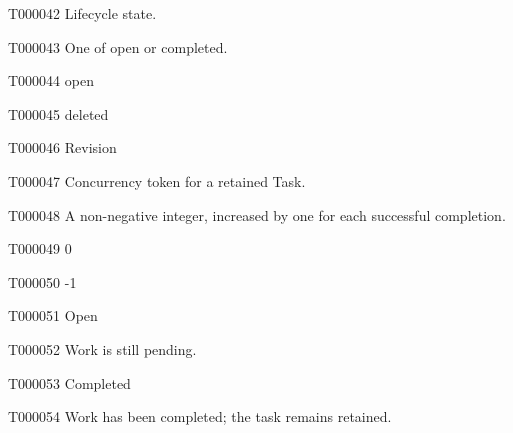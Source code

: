 \documentclass[11pt,a4paper]{article}
\begin{document}
\begin{atlasparagraph}{T000042}
Lifecycle state.
\end{atlasparagraph}
\begin{atlasparagraph}{T000043}
One of open or completed.
\end{atlasparagraph}
\begin{atlasitem}{T000044}
open
\end{atlasitem}
\begin{atlasitem}{T000045}
deleted
\end{atlasitem}
\begin{atlastext}{T000046}
Revision
\end{atlastext}
\begin{atlasparagraph}{T000047}
Concurrency token for a retained Task.
\end{atlasparagraph}
\begin{atlasparagraph}{T000048}
A non-negative integer, increased by one for each successful completion.
\end{atlasparagraph}
\begin{atlasitem}{T000049}
0
\end{atlasitem}
\begin{atlasitem}{T000050}
-1
\end{atlasitem}
\begin{atlastext}{T000051}
Open
\end{atlastext}
\begin{atlasparagraph}{T000052}
Work is still pending.
\end{atlasparagraph}
\begin{atlastext}{T000053}
Completed
\end{atlastext}
\begin{atlasparagraph}{T000054}
Work has been completed; the task remains retained.
\end{atlasparagraph}
\end{document}
